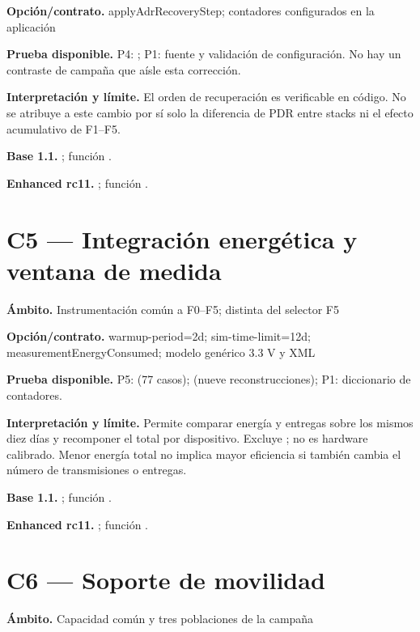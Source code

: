 \documentclass[10pt,a4paper]{article}
\begin{document}
\textbf{Opción/contrato.} applyAdrRecoveryStep; contadores  configurados en la aplicación

\textbf{Prueba disponible.} P4: ; P1: fuente y validación de configuración. No hay un contraste de campaña que aísle esta corrección.

\textbf{Interpretación y límite.} El orden de recuperación es verificable en código. No se atribuye a este cambio por sí solo la diferencia de PDR entre stacks ni el efecto acumulativo de F1–F5.

\textbf{Base 1.1.} ; función .\par
\textbf{Enhanced rc11.} ; función .\par
\section*{C5 — Integración energética y ventana de medida}
\textbf{Ámbito.} Instrumentación común a F0–F5; distinta del selector F5

\textbf{Opción/contrato.} warmup-period=2d; sim-time-limit=12d; measurementEnergyConsumed; modelo genérico 3.3 V y XML

\textbf{Prueba disponible.} P5:  (77 casos);  (nueve reconstrucciones); P1: diccionario de contadores.

\textbf{Interpretación y límite.} Permite comparar energía y entregas sobre los mismos diez días y recomponer el total por dispositivo. Excluye ; no es hardware calibrado. Menor energía total no implica mayor eficiencia si también cambia el número de transmisiones o entregas.

\textbf{Base 1.1.} ; función .\par
\textbf{Enhanced rc11.} ; función .\par
\section*{C6 — Soporte de movilidad}
\textbf{Ámbito.} Capacidad común y tres poblaciones de la campaña
\end{document}
